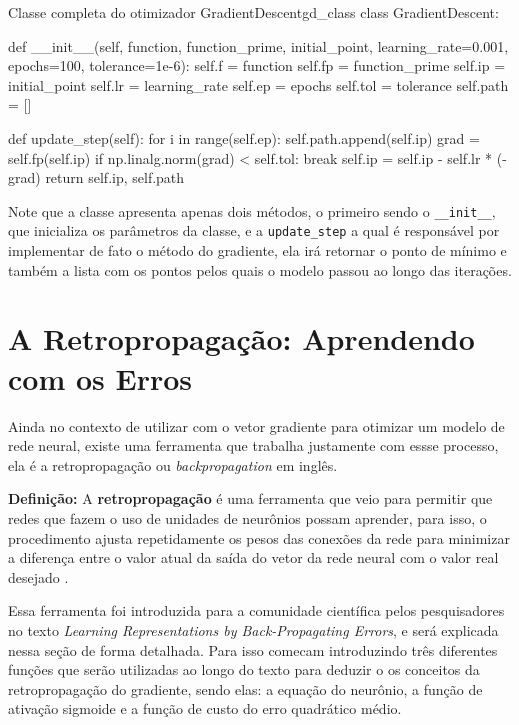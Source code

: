 \begin{codelisting}{Classe completa do otimizador GradientDescent}{gd_class}
class GradientDescent:

    def __init__(self, function, function_prime, initial_point, learning_rate=0.001, epochs=100, tolerance=1e-6):
        self.f = function
        self.fp = function_prime
        self.ip = initial_point
        self.lr = learning_rate
        self.ep = epochs
        self.tol = tolerance
        self.path = []

    def update_step(self):
        for i in range(self.ep):
            self.path.append(self.ip)
            grad = self.fp(self.ip)
            if np.linalg.norm(grad) < self.tol: break
            self.ip = self.ip - self.lr * (-grad)
        return self.ip, self.path
\end{codelisting}

Note que a classe apresenta apenas dois métodos, o primeiro sendo o \texttt{\_\_init\_\_}, que inicializa os parâmetros da classe, e a \texttt{update\_step} a qual é responsável por implementar de fato o método do gradiente, ela irá retornar o ponto de mínimo e também a lista com os pontos pelos quais o modelo passou ao longo das iterações.


\section{A Retropropagação: Aprendendo com os Erros}

Ainda no contexto de utilizar com o vetor gradiente para otimizar um modelo de rede neural, existe uma ferramenta que trabalha justamente com essse processo, ela é a retropropagação ou \textit{backpropagation} em inglês.

\begin{definicaomoderna}{\textbf{Definição:}}
A \textbf{retropropagação} é uma ferramenta que veio para permitir que redes que fazem o uso de unidades de neurônios possam aprender, para isso, o procedimento ajusta repetidamente os pesos das conexões da rede para minimizar a diferença entre o valor atual da saída do vetor da rede neural com o valor real desejado \parencite{BackpropagationArticle}.
\end{definicaomoderna}

Essa ferramenta foi introduzida para a comunidade científica pelos pesquisadores \textcite{BackpropagationArticle} no texto \textit{Learning Representations by Back-Propagating Errors}, e será explicada nessa seção de forma detalhada. Para isso \textcite{BackpropagationArticle} comecam introduzindo três diferentes funções que serão utilizadas ao longo do texto para deduzir o os conceitos da retropropagação do gradiente, sendo elas: a equação do neurônio, a função de ativação sigmoide e a função de custo do erro quadrático médio.

